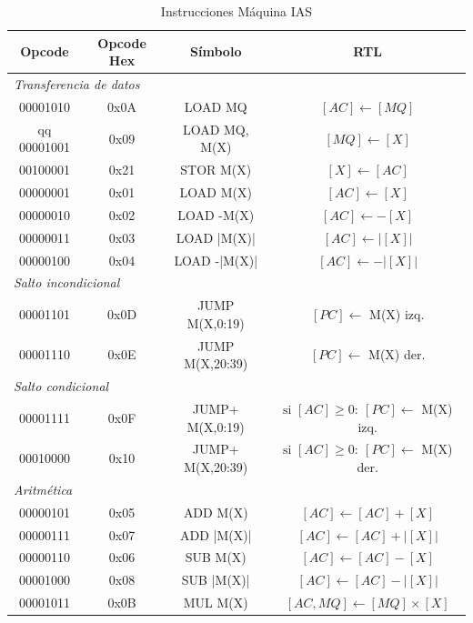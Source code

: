\documentclass{article}
\begin{document}
\begin{table}[htbp]
  \caption{Instrucciones Máquina IAS}
  \label{tab:tablaISA-IAS}
  \centering
  \begin{tabular}{|cccc|}
    \hline
    Opcode   & Opcode Hex &  Símbolo          & RTL \\ \hline
    \multicolumn{4}{|l|}{\textit{Transferencia de datos}} \\ \hline
    00001010 & 0x0A       &  LOAD MQ          & $[AC]\leftarrow[MQ]$\\qq
    00001001 & 0x09       &  LOAD MQ, M(X)    & $[MQ]\leftarrow[X]$\\
    00100001 & 0x21       &  STOR M(X)        & $[X]\leftarrow[AC]$\\
    00000001 & 0x01       &  LOAD M(X)        & $[AC]\leftarrow[X]$\\
    00000010 & 0x02       &  LOAD -M(X)       & $[AC]\leftarrow-[X]$\\
    00000011 & 0x03       &  LOAD |M(X)|      & $[AC]\leftarrow|[X]|$\\
    00000100 & 0x04       &  LOAD -|M(X)|     & $[AC]\leftarrow-|[X]|$\\ \hline
    \multicolumn{4}{|l|}{\textit{Salto incondicional}} \\ \hline
    00001101 & 0x0D       &  JUMP M(X,0:19)   & $[PC]\leftarrow$ M(X) izq.\\
    00001110 & 0x0E       &  JUMP M(X,20:39)  & $[PC]\leftarrow$ M(X) der.\\ \hline
    \multicolumn{4}{|l|}{\textit{Salto condicional}} \\ \hline
    00001111 & 0x0F       &  JUMP+ M(X,0:19)  & $\text{si }[AC]\geq 0:\ [PC]\leftarrow$ M(X) izq.\\
    00010000 & 0x10       &  JUMP+ M(X,20:39) & $\text{si }[AC]\geq 0:\ [PC]\leftarrow$ M(X) der.\\ \hline
    \multicolumn{4}{|l|}{\textit{Aritmética}} \\ \hline
    00000101 & 0x05       &  ADD M(X)         & $[AC]\leftarrow[AC]+[X]$\\
    00000111 & 0x07       &  ADD |M(X)|       & $[AC]\leftarrow[AC]+|[X]|$\\
    00000110 & 0x06       &  SUB M(X)         & $[AC]\leftarrow[AC]-[X]$\\
    00001000 & 0x08       &  SUB |M(X)|       & $[AC]\leftarrow[AC]-|[X]|$\\
    00001011 & 0x0B       &  MUL M(X)         & $[AC,MQ]\leftarrow[MQ]\times[X]$\\

\end{tabular}
\end{table}
\end{document}
